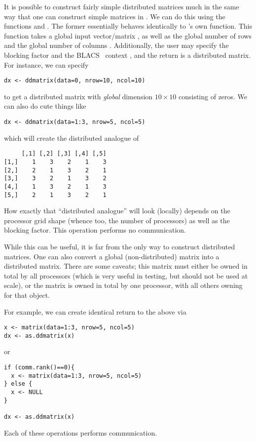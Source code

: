 It is possible to construct fairly simple distributed matrices much in the same way that one can construct simple matrices in .  We can do this using the functions  and .  The former essentially behaves identically to 's own  function.  This function takes a global input vector/matrix , as well as the global number of rows  and the global number of columns .  Additionally, the user may specify the blocking factor  and the BLACS~ context , and the return is a distributed matrix.  For instance, we can specify
\begin{lstlisting}[language=rr,title=ddmatrix()]
dx <- ddmatrix(data=0, nrow=10, ncol=10)
\end{lstlisting}
to get a distributed matrix with \emph{global} dimension $10\times 10$ consisting of zeros.  We can also do cute things like
\begin{lstlisting}[language=rr,title=ddmatrix()]
dx <- ddmatrix(data=1:3, nrow=5, ncol=5)
\end{lstlisting}
which will create the distributed analogue of
\begin{verbatim}
     [,1] [,2] [,3] [,4] [,5]
[1,]    1    3    2    1    3
[2,]    2    1    3    2    1
[3,]    3    2    1    3    2
[4,]    1    3    2    1    3
[5,]    2    1    3    2    1
\end{verbatim}
How exactly that ``distributed analogue'' will look (locally) depends on the processor grid shape (whence too, the number of processors) as well as the blocking factor.  This operation performs no communication.

While this can be useful, it is far from the only way to construct distributed matrices.  One can also convert a global (non-distributed) matrix into a distributed matrix.  There are some caveats; this matrix must either be owned in total by all processors (which is very useful in testing, but should not be used at scale), or the matrix is owned in total by one processor, with all others owning  for that object.  

For example, we can create identical return to the above via
\begin{lstlisting}[language=rr,title=as.ddmatrix()]
x <- matrix(data=1:3, nrow=5, ncol=5)
dx <- as.ddmatrix(x)
\end{lstlisting}
or
\begin{lstlisting}[language=rr,title=as.ddmatrix()]
if (comm.rank()==0){
  x <- matrix(data=1:3, nrow=5, ncol=5)
} else {
  x <- NULL
}

dx <- as.ddmatrix(x)
\end{lstlisting}
Each of these operations performs communication.

